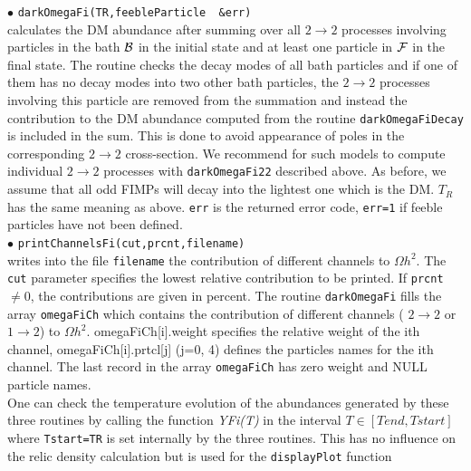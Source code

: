 \documentclass[12pt,a4paper]{article}
\begin{document}
\noindent
$\bullet$ \verb|darkOmegaFi(TR,feebleParticle  &err)|  \\
calculates the  DM abundance after summing over all 
$2\to2$ processes involving  particles in the bath ${\cal B}$ in the initial state  and at least one particle in ${\cal F}$  in the final state. The routine checks the decay modes of all bath particles and if one of them has no decay modes into two other bath particles, the $2\to2$ processes involving this particle are removed from the summation and instead the contribution to the DM abundance computed from the routine \verb|darkOmegaFiDecay| is included in the sum.  This is done to avoid appearance of poles in the corresponding $2\to2$ cross-section. We recommend for such models to compute individual $2\to2$ processes with \verb|darkOmegaFi22| described above. As before, we assume that all odd FIMPs will decay into the lightest one which is the DM. $T_R$    has the same meaning as above.
{\tt err} is the returned error code, \verb|err=1| if feeble particles have not been defined. \\

\noindent
$\bullet$ \verb|printChannelsFi(cut,prcnt,filename)|  \\
writes into the file \verb|filename| the contribution of different channels to $\Omega h^2$. The \verb|cut| parameter specifies the lowest relative contribution to be printed.   If
\verb|prcnt| $\neq 0$, the contributions are given in percent.   
The routine \verb|darkOmegaFi| fills  the array      \verb|omegaFiCh| which contains the contribution of different channels ( $2\rightarrow 2$ or $1\rightarrow 2$) to $\Omega h^2$.
omegaFiCh[i].weight specifies the relative weight of the ith channel,
omegaFiCh[i].prtcl[j] (j=0, 4) defines the particles names for the ith channel.
The last record in the array  \verb|omegaFiCh| has zero weight and NULL particle names.\\

 
One can check the  temperature evolution of the abundances generated by these three routines by calling  the function {\it YFi(T)} in the interval $T\in [ Tend, Tstart]$    
where {\tt Tstart=TR} is set internally by the three routines.  This has no influence on the relic density calculation but is used for the {\tt displayPlot} function
\end{document}
